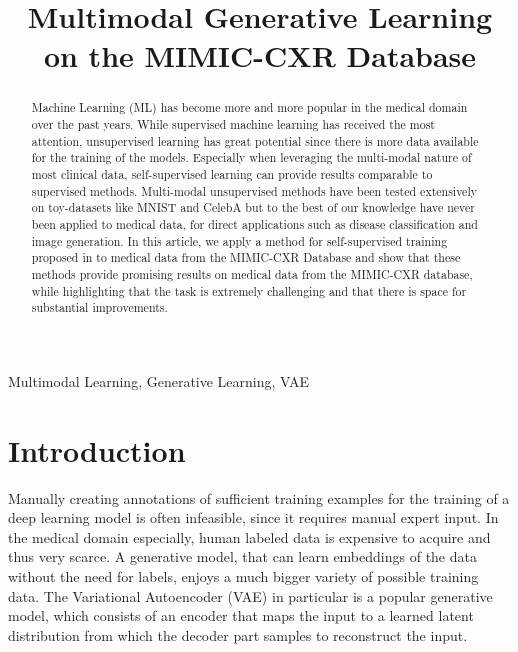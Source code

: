 \documentclass{midl} %
\title[Multimodal Generative Learning on the MIMIC-CXR Database]{Multimodal Generative Learning on the MIMIC-CXR Database}
\begin{document}
\maketitle
\begin{abstract}
    Machine Learning (ML) has become more and more popular in the medical domain over the past years.
    While supervised machine learning has received the most attention, unsupervised learning has great potential since there is more data available for the training of the models.
    Especially when leveraging the multi-modal nature of most clinical data, self-supervised learning can provide results comparable to supervised methods.
    Multi-modal unsupervised methods have been tested extensively on toy-datasets like MNIST \cite{lecun-mnisthandwrittendigit-2010, thomas_gener-ELBO, wu2018multimodal} and CelebA \cite{liu2015faceattributes, thomas_gener-ELBO, wu2018multimodal} but to the best of our knowledge have never been applied to medical data, for direct applications such as disease classification and image generation.
    In this article, we apply a method for self-supervised training proposed in \cite{thomas_gener-ELBO} to medical data from the MIMIC-CXR Database \cite{johnson2019mimic} and show that these methods provide promising results on medical data from the MIMIC-CXR database, while highlighting that the task is extremely challenging and that there is space for substantial improvements.
\end{abstract}


\begin{keywords}
Multimodal Learning, Generative Learning, VAE
\end{keywords}

\section{Introduction}

	Manually creating annotations of sufficient training examples for the training of a deep learning model is often infeasible, since it requires manual expert input.
	In the medical domain especially, human labeled data is expensive to acquire and thus very scarce.
	A generative model, that can learn embeddings of the data without the need for labels, enjoys a much bigger variety of possible training data.
	The Variational Autoencoder (VAE) \cite{doersch2016tutorial} in particular is a popular generative model, which consists of an encoder that maps the input to a learned latent distribution from which the decoder part samples to reconstruct the input.
\end{document}
